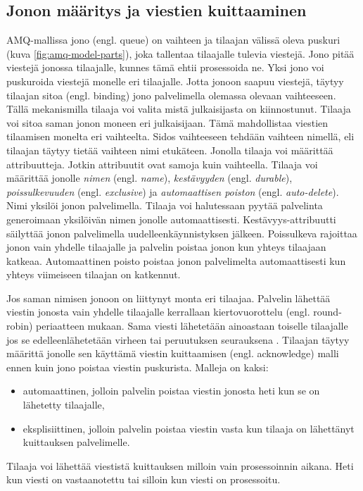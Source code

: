 \subsection{Jonon määritys ja viestien kuittaaminen}
AMQ-mallissa jono (engl. queue) on vaihteen ja tilaajan välissä oleva puskuri (kuva \ref{fig:amq-model-parts}), joka tallentaa tilaajalle tulevia viestejä. Jono pitää viestejä jonossa tilaajalle, kunnes tämä ehtii prosessoida ne. Yksi jono voi puskuroida viestejä monelle eri tilaajalle. Jotta jonoon saapuu viestejä, täytyy tilaajan sitoa (engl. binding) jono palvelimella olemassa olevaan vaihteeseen. Tällä mekanismilla tilaaja voi valita mistä julkaisijasta on kiinnostunut. Tilaaja voi sitoa saman jonon moneen eri julkaisijaan. Tämä mahdollistaa viestien tilaamisen monelta eri vaihteelta. Sidos vaihteeseen tehdään vaihteen nimellä, eli tilaajan täytyy tietää vaihteen nimi etukäteen. Jonolla tilaaja voi määrittää attribuutteja. Jotkin attribuutit ovat samoja kuin vaihteella. Tilaaja voi määrittää jonolle \emph{nimen} (engl. \emph{name}), \emph{kestävyyden} (engl. \emph{durable}), \emph{poissulkevuuden} (engl. \emph{exclusive}) ja \emph{automaattisen poiston} (engl. \emph{auto-delete}). Nimi yksilöi jonon palvelimella. Tilaaja voi halutessaan pyytää palvelinta generoimaan yksilöivän nimen jonolle automaattisesti. Kestävyys-attribuutti säilyttää jonon palvelimella uudelleenkäynnistyksen jälkeen. Poissulkeva rajoittaa jonon vain yhdelle tilaajalle ja palvelin poistaa jonon kun yhteys tilaajaan katkeaa. Automaattinen poisto poistaa jonon palvelimelta automaattisesti kun yhteys viimeiseen tilaajan on katkennut. \mbox{\cite{RabbitMQ-AMQP-0-9-1-Model-Explained}}

Jos saman nimisen jonoon on liittynyt monta eri tilaajaa. Palvelin lähettää viestin jonosta vain yhdelle tilaajalle kerrallaan kiertovuorottelu (engl. round-robin) periaatteen mukaan. Sama viesti lähetetään ainoastaan toiselle tilaajalle jos se edelleenlähetetään virheen tai peruutuksen seurauksena \mbox{\cite[s.~11--12]{AMQP-specification}}. Tilaajan täytyy määrittä jonolle sen käyttämä viestin kuittaamisen (engl. acknowledge) malli ennen kuin jono poistaa viestin puskurista. Malleja on kaksi:
\begin{itemize}
	\item automaattinen, jolloin palvelin poistaa viestin jonosta heti kun se on lähetetty tilaajalle,
	\item eksplisiittinen, jolloin palvelin poistaa viestin vasta kun tilaaja on lähettänyt kuittauksen palvelimelle.
\end{itemize}
Tilaaja voi lähettää viestistä kuittauksen milloin vain prosessoinnin aikana. Heti kun viesti on vastaanotettu tai silloin kun viesti on prosessoitu. \mbox{\cite[s.~29]{AMQP-specification}}